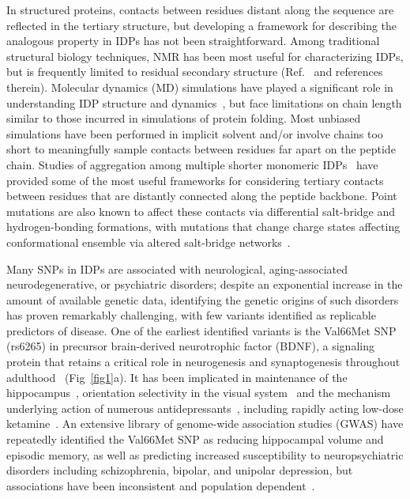 \documentclass[10pt,letterpaper]{article}
\begin{document}
In structured proteins, contacts between residues distant along the sequence are reflected in the tertiary structure, but developing a framework for describing the analogous property in IDPs has not been straightforward. Among traditional structural biology techniques, NMR has been most useful for characterizing IDPs, but is frequently limited to residual secondary structure (Ref.~\cite{Mittag2007,Habchi2014} and references therein). Molecular dynamics (MD) simulations have played a significant role in understanding IDP structure and dynamics~\cite{Stanley2015,Ithuralde2016,Knott2012b,Invernizzi2013,Yedvabny2015,Levine2017a}, but face limitations on chain length similar to those incurred in simulations of protein folding. Most unbiased simulations have been performed in implicit solvent and/or involve chains too short to meaningfully sample contacts between residues far apart on the peptide chain. Studies of aggregation among multiple shorter monomeric IDPs~\cite{Levine2015,Pappu2008} have provided some of the most useful frameworks for considering tertiary contacts between residues that are distantly connected along the peptide backbone. Point mutations are also known to affect these contacts via differential salt-bridge and hydrogen-bonding formations, with mutations that change charge states affecting conformational ensemble via altered salt-bridge networks~\cite{Levine2015}. 

Many SNPs in IDPs are associated with neurological, aging-associated neurodegenerative, or psychiatric disorders; despite an exponential increase in the amount of available genetic data, identifying the genetic origins of such disorders has proven remarkably challenging, with few variants identified as replicable predictors of disease. One of the earliest identified variants is the Val66Met SNP (rs6265) in precursor brain-derived neurotrophic factor (BDNF), a signaling protein that retains a critical role in neurogenesis and synaptogenesis throughout adulthood~\cite{Korte1995, Davies2003} (Fig~\ref{fig1}a). It has been implicated in maintenance of the hippocampus~\cite{Pezawas2004,Benjamin2010}, orientation selectivity in the visual system~\cite{Huang1999, Liu2011,Gao2014} and the mechanism underlying action of numerous antidepressants~\cite{Autry2012, Bjorkholm2016}, including rapidly acting low-dose ketamine~\cite{Autry2011}. An extensive library of genome-wide association studies (GWAS) have repeatedly identified the Val66Met SNP as reducing hippocampal volume and episodic memory, as well as predicting increased susceptibility to neuropsychiatric disorders including schizophrenia, bipolar, and unipolar depression, but associations have been inconsistent and population dependent~\cite{soliman2010,Chen2008,Verhagen2010,Notaras2015, Autry2011}.
\end{document}
